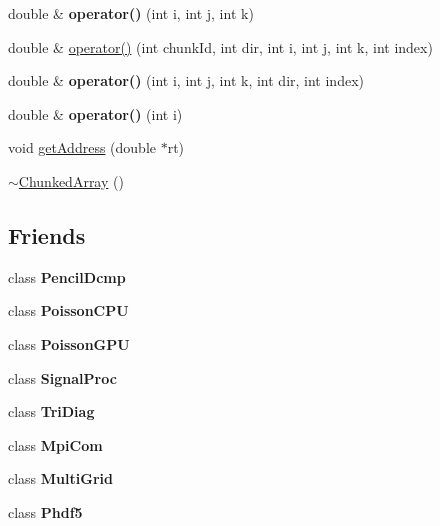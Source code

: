 \begin{DoxyCompactItemize}
double \& {\bfseries operator()} (int i, int j, int k)
\item 
double \& \mbox{\hyperlink{classChunkedArray_af75eed0a52df1e58499bd7f8fae03f49}{operator()}} (int chunk\+Id, int dir, int i, int j, int k, int index)
\item 
\mbox{\label{classChunkedArray_a8a06e93755692d416d55c5dfde9ad020}} 
double \& {\bfseries operator()} (int i, int j, int k, int dir, int index)
\item 
\mbox{\label{classChunkedArray_ad1048c7f8536caf5df66c7da482ffa94}} 
double \& {\bfseries operator()} (int i)
\item 
void \mbox{\hyperlink{classChunkedArray_aba54bf85d48b125c234e6a97867b9a84}{get\+Address}} (double $\ast$rt)
\item 
\mbox{\hyperlink{classChunkedArray_a71913a12bb4934f6e01a594ff1e429fa}{$\sim$\+Chunked\+Array}} ()
\end{DoxyCompactItemize}
\subsection*{Friends}
\begin{DoxyCompactItemize}
\item 
\mbox{\label{classChunkedArray_a89c0195380e113e4d774b5977badc321}} 
class {\bfseries Pencil\+Dcmp}
\item 
\mbox{\label{classChunkedArray_a54d4c5e140360c72f48810f28a2aa69c}} 
class {\bfseries Poisson\+C\+PU}
\item 
\mbox{\label{classChunkedArray_ae2456986f8cab7e4c0d7320415ec3c88}} 
class {\bfseries Poisson\+G\+PU}
\item 
\mbox{\label{classChunkedArray_a02f17d3a7bcc6eadc9f257ad071c2d1b}} 
class {\bfseries Signal\+Proc}
\item 
\mbox{\label{classChunkedArray_a0efda7cf27257f3a95fdee8e922f2443}} 
class {\bfseries Tri\+Diag}
\item 
\mbox{\label{classChunkedArray_ac44d19d82c46351447effb00a192c573}} 
class {\bfseries Mpi\+Com}
\item 
\mbox{\label{classChunkedArray_a6081e6e462e5143c0faaafe3fe63406d}} 
class {\bfseries Multi\+Grid}
\item 
\mbox{\label{classChunkedArray_aee5becafbd48750c5ef7fbb178bec581}} 
class {\bfseries Phdf5}
\end{DoxyCompactItemize}


